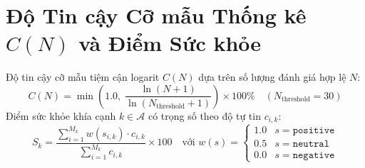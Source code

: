 \section{Độ Tin cậy Cỡ mẫu Thống kê $C(N)$ và Điểm Sức khỏe}
Độ tin cậy cỡ mẫu tiệm cận logarit $C(N)$ dựa trên số lượng đánh giá hợp lệ $N$:
\begin{equation}
\label{eq:credibility}
    C(N) = \min\left( 1.0,\; \frac{\ln(N + 1)}{\ln(N_{\text{threshold}} + 1)} \right) \times 100\% \quad (N_{\text{threshold}} = 30)
\end{equation}
Điểm sức khỏe khía cạnh $k \in \mathcal{A}$ có trọng số theo độ tự tin $c_{i,k}$:
\begin{equation}
\label{eq:health_score}
    S_k = \frac{\sum_{i=1}^{M_k} w(s_{i,k}) \cdot c_{i,k}}{\sum_{i=1}^{M_k} c_{i,k}} \times 100 \quad \text{với } w(s) = \begin{cases} 1.0 & s = \texttt{positive} \\ 0.5 & s = \texttt{neutral} \\ 0.0 & s = \texttt{negative} \end{cases}
\end{equation}
